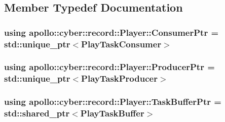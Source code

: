 \subsection{Member Typedef Documentation}
\hypertarget{classapollo_1_1cyber_1_1record_1_1Player_a37e1db52ec97f2d722a96728ee34eca4}{
\subsubsection[{Consumer\-Ptr}]{\setlength{\rightskip}{0pt plus 5cm}using {\bf apollo\-::cyber\-::record\-::\-Player\-::\-Consumer\-Ptr} =  std\-::unique\-\_\-ptr$<${\bf Play\-Task\-Consumer}$>$}}\label{classapollo_1_1cyber_1_1record_1_1Player_a37e1db52ec97f2d722a96728ee34eca4}
\hypertarget{classapollo_1_1cyber_1_1record_1_1Player_acc295a5b34f4d9286c0e5abdb19708cc}{
\subsubsection[{Producer\-Ptr}]{\setlength{\rightskip}{0pt plus 5cm}using {\bf apollo\-::cyber\-::record\-::\-Player\-::\-Producer\-Ptr} =  std\-::unique\-\_\-ptr$<${\bf Play\-Task\-Producer}$>$}}\label{classapollo_1_1cyber_1_1record_1_1Player_acc295a5b34f4d9286c0e5abdb19708cc}
\hypertarget{classapollo_1_1cyber_1_1record_1_1Player_ab31c13eb2f49c83db3e5ab2241e4a649}{
\subsubsection[{Task\-Buffer\-Ptr}]{\setlength{\rightskip}{0pt plus 5cm}using {\bf apollo\-::cyber\-::record\-::\-Player\-::\-Task\-Buffer\-Ptr} =  std\-::shared\-\_\-ptr$<${\bf Play\-Task\-Buffer}$>$}}\label{classapollo_1_1cyber_1_1record_1_1Player_ab31c13eb2f49c83db3e5ab2241e4a649}



